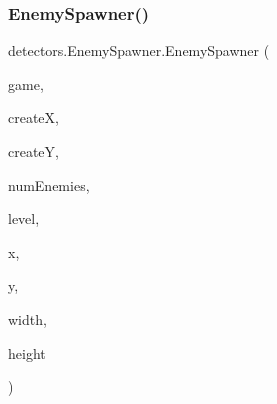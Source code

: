 \subsubsection{\texorpdfstring{Enemy\+Spawner()}{EnemySpawner()}\hspace{0.1cm}{\footnotesize\ttfamily [1/2]}}
{\footnotesize\ttfamily detectors.\+Enemy\+Spawner.\+Enemy\+Spawner (\begin{DoxyParamCaption}\item[{\mbox{\hyperlink{classstates_1_1_game_state}{Game\+State}}}]{game,  }\item[{int}]{createX,  }\item[{int}]{createY,  }\item[{int}]{num\+Enemies,  }\item[{int}]{level,  }\item[{float}]{x,  }\item[{float}]{y,  }\item[{float}]{width,  }\item[{float}]{height }\end{DoxyParamCaption})\hspace{0.3cm}{\ttfamily [inline]}}


